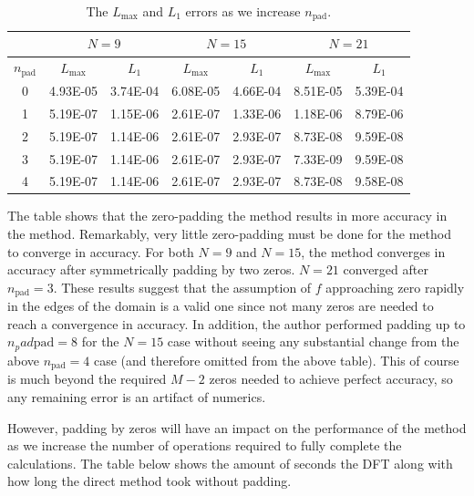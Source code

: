 \documentclass[12pt]{CSUNthesis}
\begin{document}
 \begin{table}[h]
  \begin{tabular}[c]{ c c c | c c | c c }
  \hline
  \multicolumn{1}{c}{} &
  \multicolumn{2}{c|}{$N = 9$} &
  \multicolumn{2}{c|}{$N = 15$} &
  \multicolumn{2}{c}{$N = 21$} \\
    \hline 
    $n_{\text{pad}}$ & $L_{\max}$  & $L_1$ & $L_{\max}$  & $L_1$ & $L_{\max}$  & $L_1$\\
    \hline
0 & 4.93E-05 & 3.74E-04 & 6.08E-05 & 4.66E-04 & 8.51E-05 & 5.39E-04\\
1 & 5.19E-07 & 1.15E-06 & 2.61E-07 & 1.33E-06 & 1.18E-06 & 8.79E-06\\
2 & 5.19E-07 & 1.14E-06 & 2.61E-07 & 2.93E-07 & 8.73E-08 & 9.59E-08\\
3 & 5.19E-07 & 1.14E-06 & 2.61E-07 & 2.93E-07 & 7.33E-09 & 9.59E-08\\
4 & 5.19E-07 & 1.14E-06 & 2.61E-07 & 2.93E-07 & 8.73E-08 & 9.58E-08\\
    \hline
  \end{tabular}
\caption{\label{tab:padding_m155} The $L_{\max}$ and $L_1$ errors as we increase $n_{\text{pad}}$. }
\end{table}

The table shows that the zero-padding the method results in more accuracy in the method. Remarkably, very little zero-padding must be done for the method to converge in accuracy. For both $N=9$ and $N=15$, the method converges in accuracy after symmetrically padding by two zeros. $N=21$ converged after $n_{\text{pad}} = 3$. 
These results suggest that the assumption of $f$ approaching zero rapidly in the edges of the domain is a valid one since not many zeros are needed to reach a convergence in accuracy. In addition, the author performed padding up to $n_pad{\text{pad}}=8$  for the $N=15$ case without seeing any substantial change from the above $n_{\text{pad}}=4$ case (and therefore omitted from the above table). This of course is much beyond the required $M-2$ zeros needed to achieve perfect accuracy, so any remaining error is an artifact of numerics.

However, padding by zeros will have an impact on the performance of the method as we increase the number of operations required to fully complete the calculations. The table below shows the amount of seconds the DFT along with how long the direct method took without padding.
\end{document}
